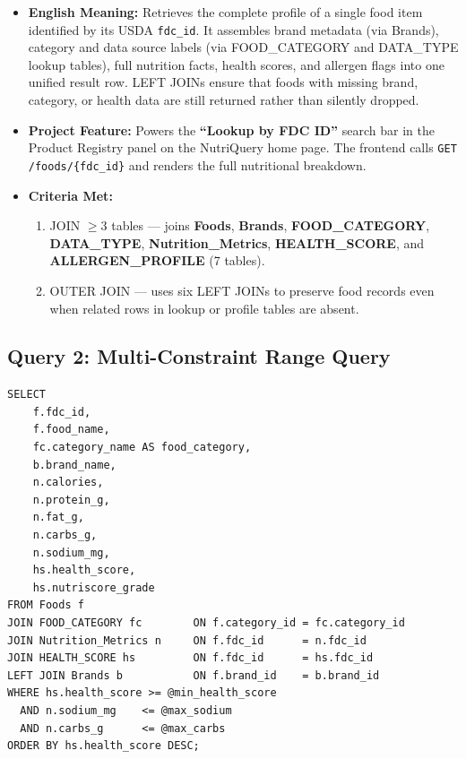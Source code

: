 \documentclass[12pt,a4paper]{article}
\begin{document}
\begin{metabox}
\begin{itemize}
  \item \textbf{English Meaning:} Retrieves the complete profile of a single food item identified
    by its USDA \texttt{fdc\_id}. It assembles brand metadata (via Brands), category and data source
    labels (via FOOD\_CATEGORY and DATA\_TYPE lookup tables), full nutrition facts, health scores,
    and allergen flags into one unified result row. LEFT JOINs ensure that foods with missing
    brand, category, or health data are still returned rather than silently dropped.
  \item \textbf{Project Feature:} Powers the \textbf{``Lookup by FDC ID''} search bar in the Product
    Registry panel on the NutriQuery home page. The frontend calls \texttt{GET /foods/\{fdc\_id\}}
    and renders the full nutritional breakdown.
  \item \textbf{Criteria Met:}
    \begin{enumerate}[label=\textbf{\arabic*}]
      \item JOIN $\geq$3 tables --- joins \textbf{Foods}, \textbf{Brands}, \textbf{FOOD\_CATEGORY},
        \textbf{DATA\_TYPE}, \textbf{Nutrition\_Metrics}, \textbf{HEALTH\_SCORE}, and
        \textbf{ALLERGEN\_PROFILE} (7 tables).
      \item OUTER JOIN --- uses six LEFT JOINs to preserve food records even when related
        rows in lookup or profile tables are absent.
    \end{enumerate}
\end{itemize}
\end{metabox}

\newpage

\subsection{Query 2: Multi-Constraint Range Query}

\begin{sqlbox}
\small
\begin{verbatim}
SELECT
    f.fdc_id,
    f.food_name,
    fc.category_name AS food_category,
    b.brand_name,
    n.calories,
    n.protein_g,
    n.fat_g,
    n.carbs_g,
    n.sodium_mg,
    hs.health_score,
    hs.nutriscore_grade
FROM Foods f
JOIN FOOD_CATEGORY fc        ON f.category_id = fc.category_id
JOIN Nutrition_Metrics n     ON f.fdc_id      = n.fdc_id
JOIN HEALTH_SCORE hs         ON f.fdc_id      = hs.fdc_id
LEFT JOIN Brands b           ON f.brand_id    = b.brand_id
WHERE hs.health_score >= @min_health_score
  AND n.sodium_mg    <= @max_sodium
  AND n.carbs_g      <= @max_carbs
ORDER BY hs.health_score DESC;
\end{verbatim}
\end{sqlbox}
\end{document}
